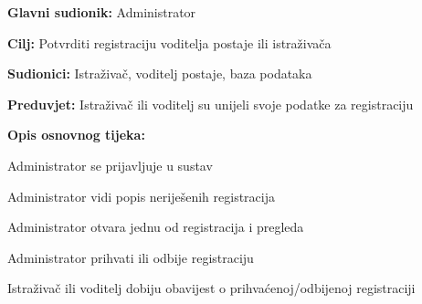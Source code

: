 					\noindent {}
					\begin{packed_item}
						
						\item \textbf{Glavni sudionik: }Administrator
						\item  \textbf{Cilj:} Potvrditi registraciju voditelja postaje ili istraživača
						\item  \textbf{Sudionici:} Istraživač, voditelj postaje, baza podataka
						\item  \textbf{Preduvjet:} Istraživač ili voditelj su unijeli svoje podatke za registraciju
						\item  \textbf{Opis osnovnog tijeka:}
						
						\item[] \begin{packed_enum}
							
							\item Administrator se prijavljuje u sustav
							\item Administrator vidi popis neriješenih registracija
							\item Administrator otvara jednu od registracija i pregleda
							\item Administrator prihvati ili odbije registraciju
							\item Istraživač ili voditelj dobiju obavijest o prihvaćenoj/odbijenoj registraciji
						\end{packed_enum}
						
					\end{packed_item}
					\vspace{12pt}
					\vspace{12pt}
					\vspace{12pt}
					\vspace{12pt}
					\vspace{12pt}
					
